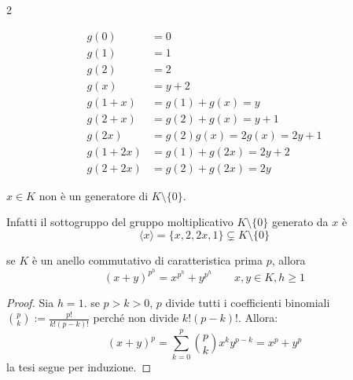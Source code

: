 \documentclass[../main.tex]{subfiles}
\begin{document}
\begin{example}
\begin{multicols}{2}
        \columnbreak

        \begin{align*}
            g(0)      & = 0                         \\
            g(1)      & = 1                         \\
            g(2)      & = 2                         \\
            g(x)      & = y + 2                     \\
            g(1 + x)  & = g(1) + g(x) = y           \\
            g(2 + x)  & = g(2) + g(x) = y + 1       \\
            g(2x)     & = g(2)g(x) = 2g(x) = 2y + 1 \\
            g(1 + 2x) & = g(1) + g(2x) = 2y + 2     \\
            g(2 + 2x) & = g(2) + g(2x) = 2y
        \end{align*}
    \end{multicols}
\end{example}

\begin{remark}
    $x \in K$ non è un generatore di $K \setminus \{0\}$.

    Infatti il sottogruppo del gruppo moltiplicativo $K \setminus \{0\}$ generato da $x$ è
    \begin{equation*}
        \langle x\rangle = \{x, 2, 2x, 1\} \subsetneq K \setminus \{0\}
    \end{equation*}
\end{remark}

\begin{lemma}
    se $K$ è un anello commutativo di caratteristica prima $p$, allora
    \begin{equation*}
        (x + y)^{p^h} = x^{p^h} + y^{p^h} \qquad x, y \in K, h \geq 1
    \end{equation*}
\end{lemma}

\begin{proof}
    Sia $h = 1$. se $p > k > 0$, $p$ divide tutti i coefficienti binomiali $\binom{p}{k} := \frac{p!}{k!(p-k)!}$ perché non divide $k!(p-k)!$. Allora:
    \begin{equation*}
        (x + y)^p = \sum_{k=0}^{p} \binom{p}{k} x^k y^{p-k} = x^p + y^p
    \end{equation*}
    la tesi segue per induzione.
\end{proof}
\end{document}
